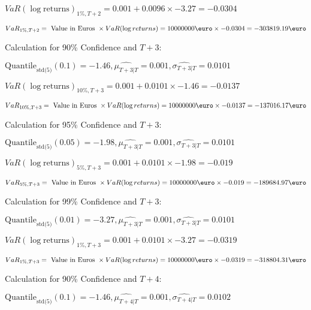 \indent\indent $VaR(\log \text{returns})_{1\%, T + 2} = 0.001 + 0.0096\times-3.27 = -0.0304$

\indent\indent $VaR_{1\%, T + 2} = \text{ Value in Euros } \times VaR(\log returns) = 10 000 000 \text{\euro} \times-0.0304 = -303819.19 \text{\euro}$\newline




Calculation for 90\% Confidence and $T+3$:

\indent\indent $\text{Quantile}_\text{std(5)}(0.1) = -1.46,\hat{\mu_{T+3|T}} = 0.001, \hat{\sigma_{T+3|T}} = 0.0101$

\indent\indent $VaR(\log \text{returns})_{10\%, T + 3} = 0.001 + 0.0101\times-1.46 = -0.0137$

\indent\indent $VaR_{10\%, T + 3} = \text{ Value in Euros } \times VaR(\log returns) = 10 000 000 \text{\euro} \times-0.0137 = -137016.17 \text{\euro}$\newline




Calculation for 95\% Confidence and $T+3$:

\indent\indent $\text{Quantile}_\text{std(5)}(0.05) = -1.98,\hat{\mu_{T+3|T}} = 0.001, \hat{\sigma_{T+3|T}} = 0.0101$

\indent\indent $VaR(\log \text{returns})_{5\%, T + 3} = 0.001 + 0.0101\times-1.98 = -0.019$

\indent\indent $VaR_{5\%, T + 3} = \text{ Value in Euros } \times VaR(\log returns) = 10 000 000 \text{\euro} \times-0.019 = -189684.97 \text{\euro}$\newline




Calculation for 99\% Confidence and $T+3$:

\indent\indent $\text{Quantile}_\text{std(5)}(0.01) = -3.27,\hat{\mu_{T+3|T}} = 0.001, \hat{\sigma_{T+3|T}} = 0.0101$

\indent\indent $VaR(\log \text{returns})_{1\%, T + 3} = 0.001 + 0.0101\times-3.27 = -0.0319$

\indent\indent $VaR_{1\%, T + 3} = \text{ Value in Euros } \times VaR(\log returns) = 10 000 000 \text{\euro} \times-0.0319 = -318804.31 \text{\euro}$\newline




Calculation for 90\% Confidence and $T+4$:

\indent\indent $\text{Quantile}_\text{std(5)}(0.1) = -1.46,\hat{\mu_{T+4|T}} = 0.001, \hat{\sigma_{T+4|T}} = 0.0102$

